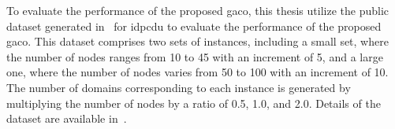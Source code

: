 To evaluate the performance of the proposed \acrshort{gaco}, 
this thesis utilize the public dataset generated in~\cite{binh2020multifactorial} for \gls{idpcdu} to evaluate the performance of the proposed \acrshort{gaco}. 
This dataset comprises two sets of instances, including a small set, where the number of nodes ranges from 10 to 45 with an increment of 5, and a large one, where the number of nodes varies from 50 to 100 with an increment of 10.
The number of domains corresponding to each instance is generated by multiplying the number of nodes by a ratio of 0.5, 1.0, and 2.0. Details of the dataset are available in~\cite{idpcdu2020data}.